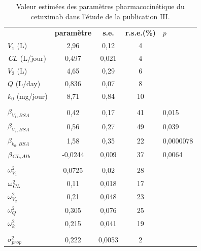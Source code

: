 \begin{table}[!ht]
  \centering
  \caption{Valeur estimées des paramètres pharmacocinétique du cetuximab dans l'étude de la publication III.}
    \begin{tabular}{lcccl}
       &  &  &  &  \\
      \hline
      \textbf{} & \textbf{paramètre} & \textbf{s.e.} & \textbf{r.s.e.(\%)} & $p$ \\
      \hline
      \hline
      $V_1$ (L) & 2,96 & 0,12 & 4 &  \\
      $\operatorname{\textit{CL}}$ (L/jour) & 0,497 & 0,021 & 4 &  \\
      $V_2$ (L) & 4,65 & 0,29 & 6 &  \\
      $Q$ (L/day) & 0,836 & 0,07 & 8 &  \\
      $k_0$ (mg/jour) & 8,71 & 0,84 & 10 &  \\
       &  &  &  &  \\
      $\beta_{V_1,BSA}$ & 0,42 & 0,17 & 41 & 0,015 \\
      $\beta_{V_2,BSA}$ & 0,56 & 0,27 & 49 & 0,039 \\
      $\beta_{k_0,BSA}$ & 1,58 & 0,35 & 22 & 0,0000078 \\
      $\beta_{\operatorname{\textit{CL}},Alb}$  & -0,0244 & 0,009 & 37 & 0,0064 \\
       &  &  &  &  \\
      $\omega^2_{V_1}$ & 0,0725 & 0,02 & 28 &  \\
      $\omega^2_{\operatorname{\textit{CL}}}$ & 0,11 & 0,018 & 17 &  \\
      $\omega^2_{V_2}$ & 0,21 & 0,048 & 23 &  \\
      $\omega^2_{Q}$ & 0,305 & 0,076 & 25 &  \\
      $\omega^2_{k_0}$ & 0,215 & 0,041 & 19 &  \\
       &  &  &  &  \\
      $\sigma^2_{prop}$ & 0,222 & 0,0053 & 2 &  \\
      \hline
    \end{tabular}
  \label{tab:3}
\end{table}
 
